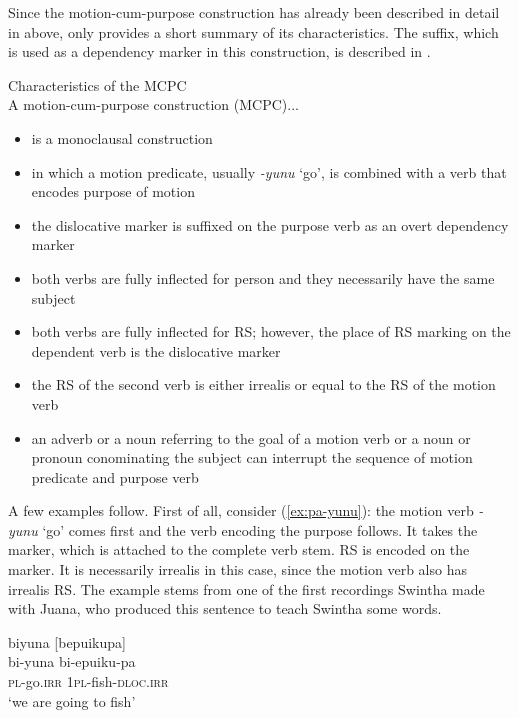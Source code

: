 Since the motion-cum-purpose construction has already been described in detail in  above,  only provides a short summary of its characteristics. The  suffix, which is used as a dependency marker in this construction, is described in .

\ea
\label{exfig:MCPC}
\upshape
{Characteristics of the MCPC}\\
A motion-cum-purpose construction (MCPC)... \\
\begin{itemize}
\item is a monoclausal construction
\item in which a motion predicate, usually \textit{-yunu} ‘go’, is combined with a verb that encodes purpose of motion
\item the dislocative marker is suffixed on the purpose verb as an overt dependency marker
\item both verbs are fully inflected for person and they necessarily have the same subject
\item both verbs are fully inflected for RS; however, the place of RS marking on the dependent verb is the dislocative marker
\item the RS of the second verb is either irrealis or equal to the RS of the motion verb
\item an adverb or a noun referring to the goal of a motion verb or a noun or pronoun conominating the subject can interrupt the sequence of motion predicate and purpose verb
\end{itemize}
%
\z



A few examples follow. First of all, consider (\ref{ex:pa-yunu}): the motion verb \textit{-yunu} ‘go’ comes first and the verb encoding the purpose follows. It takes the  marker, which is attached to the complete verb stem. RS is encoded on the  marker. It is necessarily irrealis in this case, since the motion verb also has irrealis RS. The example stems from one of the first recordings Swintha made with Juana, who produced this sentence to teach Swintha some words.

\ea\label{ex:pa-yunu}
\begingl 
\glpreamble biyuna \textup{[}bepuikupa\textup{]}\\
\gla bi-yuna bi-epuiku-pa\\ 
\textsc{pl}-go.\textsc{irr} 1\textsc{pl}-fish-\textsc{dloc.irr}\\ 
\glft ‘we are going to fish’
\trailingcitation{[jxx-e081025s-1.158]}
\xe


